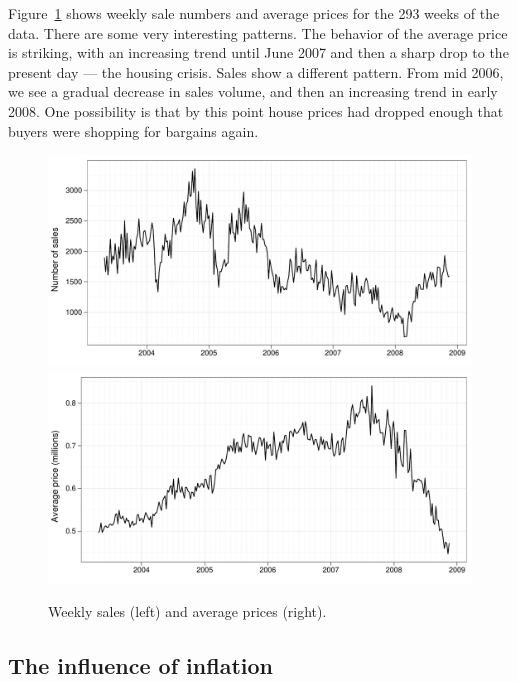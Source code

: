 \documentclass[oneside]{article}
\begin{document}
Figure~\ref{fig:daily} shows weekly sale numbers and average prices for the 293 weeks of the data.  There are some very interesting patterns.  The behavior of the average price is striking, with an increasing trend until June 2007 and then a sharp drop to the present day --- the housing crisis.  Sales show a different pattern.  From mid 2006, we see a gradual decrease in sales volume, and then an increasing trend in early 2008.  One possibility is that by this point house prices had dropped enough that buyers were shopping for bargains again.

\begin{figure}[htbp]
  \centering
    \includegraphics[width=0.5 \linewidth]{daily-sales}%
    \includegraphics[width=0.5 \linewidth]{daily-price}%
  \caption{Weekly sales (left) and average prices (right).}
  \label{fig:daily}
\end{figure}


\subsection{The influence of inflation}
\end{document}
